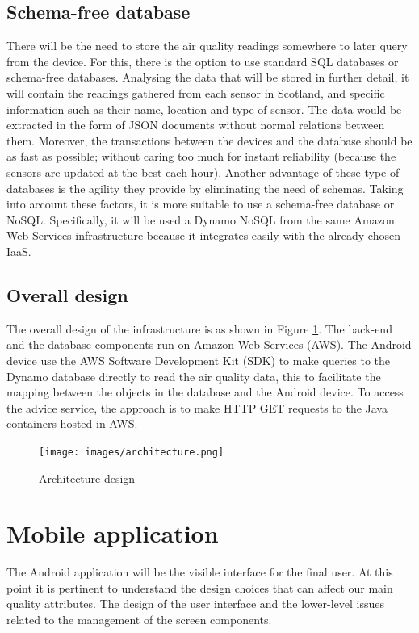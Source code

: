 \subsection{Schema-free database}
There will be the need to store the air quality readings somewhere to later query from the device. For this, there is the option to use standard SQL databases or schema-free databases. Analysing the data that will be stored in further detail, it will contain the readings gathered from each sensor in Scotland, and specific information such as their name, location and type of sensor. The data would be extracted in the form of JSON documents without normal relations between them. Moreover, the transactions between the devices and the database should be as fast as possible; without caring too much for instant reliability (because the sensors are updated at the best each hour). Another advantage of these type of databases is the agility they provide by eliminating the need of schemas. Taking into account these factors, it is more suitable to use a schema-free database or NoSQL. Specifically, it will be used a Dynamo NoSQL from the same Amazon Web Services infrastructure because it integrates easily with the already chosen IaaS.

\subsection{Overall design}
The overall design of the infrastructure is as shown in Figure \ref{fig:architecture}. The back-end and the database components run on Amazon Web Services (AWS). The Android device use the AWS Software Development Kit (SDK) to make queries to the Dynamo database directly to read the air quality data, this to facilitate the mapping between the objects in the database and the Android device. To access the advice service, the approach is to make HTTP GET requests to the Java containers hosted in AWS. 
\begin{figure}[H]
\begin{adjustbox}{width=.65\textwidth,center=\textwidth}
  \centering
  \texttt{[image: images/architecture.png]}
\end{adjustbox}
  \caption[Architecture design]{Architecture design}
  \label{fig:architecture}
\end{figure}

\section{Mobile application}
The Android application will be the visible interface for the final user. At this point it is pertinent to understand the design choices that can affect our main quality attributes. The design of the user interface and the lower-level issues related to the management of the screen components. 

